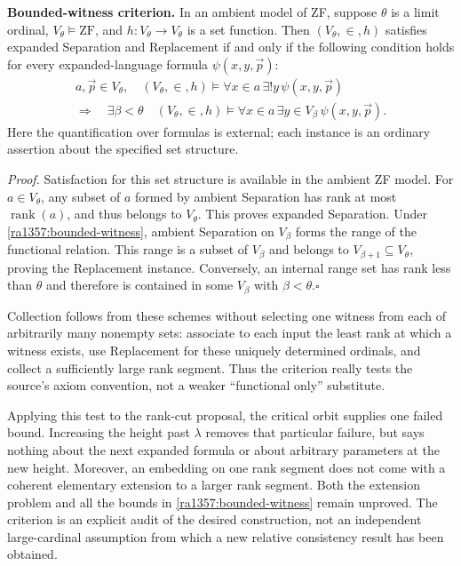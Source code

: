 \documentclass[11pt]{article}
\begin{document}
\textbf{Bounded-witness criterion.}
In an ambient model of ZF, suppose $\theta$ is a limit ordinal,
$V_\theta\models\mathrm{ZF}$, and $h:V_\theta\to V_\theta$ is a set function.
Then $(V_\theta,\in,h)$ satisfies expanded Separation and Replacement if and
only if the following condition holds for every expanded-language formula
$\psi(x,y,\vec p)$:
\begin{equation}\label{ra1357:bounded-witness}
 \begin{gathered}
 a,\vec p\in V_\theta,\quad
 (V_\theta,\in,h)\models\forall x\in a\,\exists!y\,\psi(x,y,\vec p)
 \\[-2pt]
 \Longrightarrow\quad
 \exists\beta<\theta\quad
 (V_\theta,\in,h)\models
 \forall x\in a\,\exists y\in V_\beta\,\psi(x,y,\vec p).
 \end{gathered}
\end{equation}
Here the quantification over formulas is external; each instance is an
ordinary assertion about the specified set structure.

\emph{Proof.}
Satisfaction for this set structure is available in the ambient ZF model.
For $a\in V_\theta$, any subset of $a$ formed by ambient Separation has rank
at most $\operatorname{rank}(a)$, and thus belongs to $V_\theta$.  This proves
expanded Separation.  Under \eqref{ra1357:bounded-witness}, ambient Separation
on $V_\beta$ forms the range of the functional relation.  This range is a
subset of $V_\beta$ and belongs to $V_{\beta+1}\subseteq V_\theta$, proving
the Replacement instance.  Conversely, an internal range set has rank less
than $\theta$ and therefore is contained in some $V_\beta$ with
$\beta<\theta$.\hfill$\square$

Collection follows from these schemes without selecting one witness from
each of arbitrarily many nonempty sets: associate to each input the least
rank at which a witness exists, use Replacement for these uniquely determined
ordinals, and collect a sufficiently large rank segment.  Thus the criterion
really tests the source's axiom convention, not a weaker ``functional only''
substitute.

Applying this test to the rank-cut proposal, the critical orbit supplies one
failed bound.  Increasing the height past $\lambda$ removes that particular
failure, but says nothing about the next expanded formula or about arbitrary
parameters at the new height.  Moreover, an embedding on one rank segment
does not come with a coherent elementary extension to a larger rank segment.
Both the extension problem and all the bounds in
\eqref{ra1357:bounded-witness} remain unproved.  The criterion is an explicit
audit of the desired construction, not an independent large-cardinal
assumption from which a new relative consistency result has been obtained.
\end{document}
